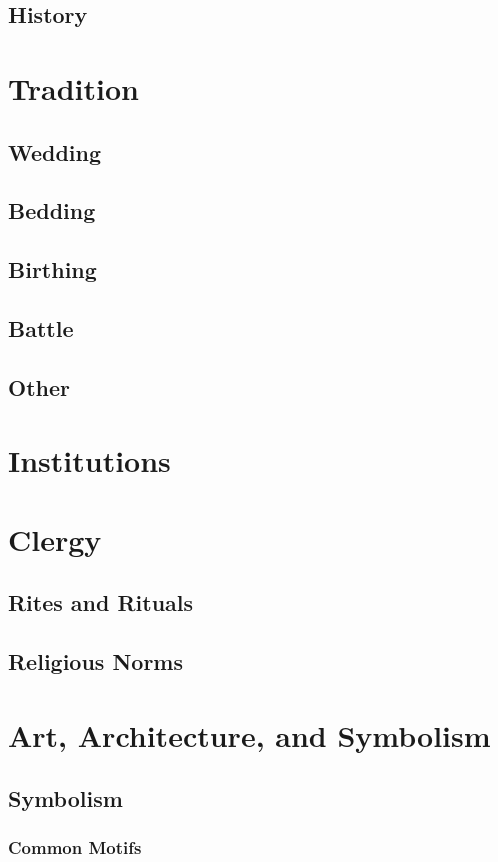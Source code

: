 \subsection{History}

\section{Tradition}
\subsection{Wedding}
\subsection{Bedding}
\subsection{Birthing}
\subsection{Battle}
\subsection{Other}

\section{Institutions}
\section{Clergy}
\subsection{Rites and Rituals}
\subsection{Religious Norms}

\section{Art, Architecture, and Symbolism}
\subsection{Symbolism}
\subsubsection{Common Motifs}

